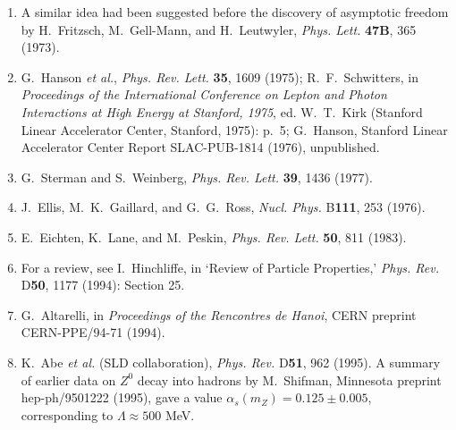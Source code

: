 \begin{enumerate}
  \item {}\label{ch18-ref-19}
  A similar idea had been suggested before the discovery of asymptotic freedom by H.~Fritzsch, M.~Gell-Mann, and H.~Leutwyler, \textit{Phys. Lett.} \textbf{47B}, 365 (1973).

  \item {}\label{ch18-ref-20}
  G.~Hanson \textit{et al.}, \textit{Phys. Rev. Lett.} \textbf{35}, 1609 (1975); R.~F.~Schwitters, in \textit{Proceedings of the International Conference on Lepton and Photon Interactions at High Energy at Stanford, 1975}, ed. W.~T.~Kirk (Stanford Linear Accelerator Center, Stanford, 1975): p.~5; G.~Hanson, Stanford Linear Accelerator Center Report SLAC-PUB-1814 (1976), unpublished.

  \item {}\label{ch18-ref-21}
  G.~Sterman and S.~Weinberg, \textit{Phys. Rev. Lett.} \textbf{39}, 1436 (1977).

  \item {}\label{ch18-ref-22}
  J.~Ellis, M.~K.~Gaillard, and G.~G.~Ross, \textit{Nucl. Phys.} B\textbf{111}, 253 (1976).

  \item {}\label{ch18-ref-23}
  E.~Eichten, K.~Lane, and M.~Peskin, \textit{Phys. Rev. Lett.} \textbf{50}, 811 (1983).

  \item {}\label{ch18-ref-24}
  For a review, see I.~Hinchliffe, in `Review of Particle Properties,' \textit{Phys. Rev.} D\textbf{50}, 1177 (1994): Section 25.

  \item {}\label{ch18-ref-25}
  G.~Altarelli, in \textit{Proceedings of the Rencontres de Hanoi}, CERN preprint CERN-PPE/94-71 (1994).

  \item {}\label{ch18-ref-26}
  K.~Abe \textit{et al.} (SLD collaboration), \textit{Phys. Rev.} D\textbf{51}, 962 (1995). A summary of earlier data on $Z^0$ decay into hadrons by M.~Shifman, Minnesota preprint hep-ph/9501222 (1995), gave a value $\alpha_s(m_Z)=0.125\pm0.005$, corresponding to $\Lambda\approx500$ MeV.
\end{enumerate}
